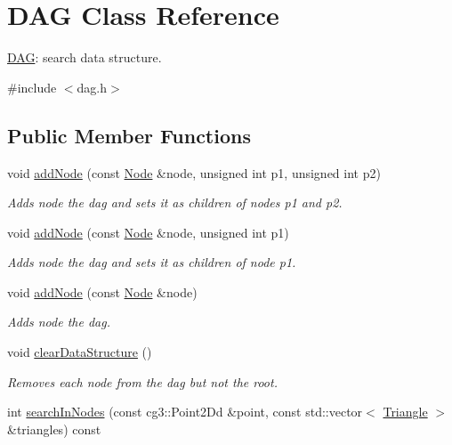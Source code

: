 \hypertarget{classDAG}{}\section{D\+AG Class Reference}
\label{classDAG}


\hyperlink{classDAG}{D\+AG}\+: search data structure.  




{\ttfamily \#include $<$dag.\+h$>$}

\subsection*{Public Member Functions}
\begin{DoxyCompactItemize}
\item 
void \hyperlink{classDAG_aed6fe76f8e3400755b063bc0d0152955}{add\+Node} (const \hyperlink{classNode}{Node} \&node, unsigned int p1, unsigned int p2)
\begin{DoxyCompactList}\small\item\em Adds node the dag and sets it as children of nodes p1 and p2. \end{DoxyCompactList}\item 
void \hyperlink{classDAG_ac0ca03d85f1bd95c9e2dd092923d21ed}{add\+Node} (const \hyperlink{classNode}{Node} \&node, unsigned int p1)
\begin{DoxyCompactList}\small\item\em Adds node the dag and sets it as children of node p1. \end{DoxyCompactList}\item 
void \hyperlink{classDAG_a88682a026a8f2931dbe64fc5085430ec}{add\+Node} (const \hyperlink{classNode}{Node} \&node)
\begin{DoxyCompactList}\small\item\em Adds node the dag. \end{DoxyCompactList}\item 
\mbox{\label{classDAG_a04bf7ea8f5319b8dbcf2814d5c42e292}} 
void \hyperlink{classDAG_a04bf7ea8f5319b8dbcf2814d5c42e292}{clear\+Data\+Structure} ()
\begin{DoxyCompactList}\small\item\em Removes each node from the dag but not the root. \end{DoxyCompactList}\item 
int \hyperlink{classDAG_addd2c3b6de47c3873bb6c0bd074f2a67}{search\+In\+Nodes} (const cg3\+::\+Point2\+Dd \&point, const std\+::vector$<$ \hyperlink{classTriangle}{Triangle} $>$ \&triangles) const

\end{DoxyCompactItemize}
